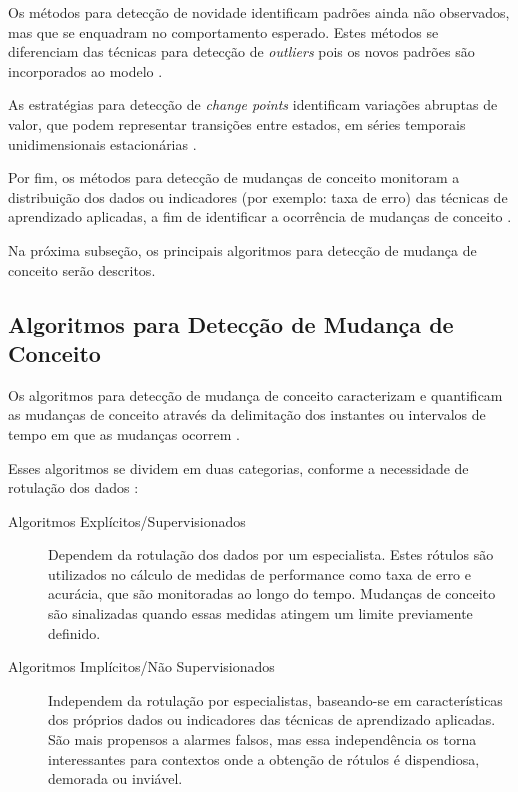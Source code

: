 \documentclass[qual, classic, a4paper]{ufbathesis}
\begin{document}
Os métodos para detecção de novidade identificam padrões ainda não observados, mas que se enquadram no comportamento esperado.
Estes métodos se diferenciam das técnicas para detecção de \textit{outliers} pois os novos padrões são incorporados ao modelo \cite{Chandola:2009:ADS:1541880.1541882}.

As estratégias para detecção de \textit{change points} identificam variações abruptas de valor, que podem representar transições entre estados, em séries temporais unidimensionais estacionárias \cite{Aminikhanghahi:2017:SMT:3086013.3086037}.

Por fim, os métodos para detecção de mudanças de conceito monitoram a distribuição dos dados ou indicadores (por exemplo: taxa de erro) das técnicas de aprendizado aplicadas, a fim de identificar a ocorrência de mudanças de conceito \cite{Gama:2014:SCD:2597757.2523813}.

Na próxima subseção, os principais algoritmos para detecção de mudança de conceito serão descritos.

\subsection{Algoritmos para Detecção de Mudança de Conceito}

Os algoritmos para detecção de mudança de conceito caracterizam e quantificam as mudanças de conceito através da delimitação dos instantes ou intervalos de tempo em que as mudanças ocorrem \cite{Basseville:1993:DAC:151741}.

Esses algoritmos se dividem em duas categorias, conforme a necessidade de rotulação dos dados \cite{Zliobaite:2010}:

\begin{description}
    \item[Algoritmos Explícitos/Supervisionados] Dependem da rotulação dos dados por um especialista.
    Estes rótulos são utilizados no cálculo de medidas de performance como taxa de erro e acurácia, que são monitoradas ao longo do tempo.
    Mudanças de conceito são sinalizadas quando essas medidas atingem um limite previamente definido.

    \item[Algoritmos Implícitos/Não Supervisionados] Independem da rotulação por especialistas, 
    baseando-se em características dos próprios dados ou indicadores das técnicas de aprendizado aplicadas.
    São mais propensos a alarmes falsos, mas essa independência os torna interessantes para contextos onde a obtenção de rótulos é dispendiosa, demorada ou inviável.
\end{description}
\end{document}
